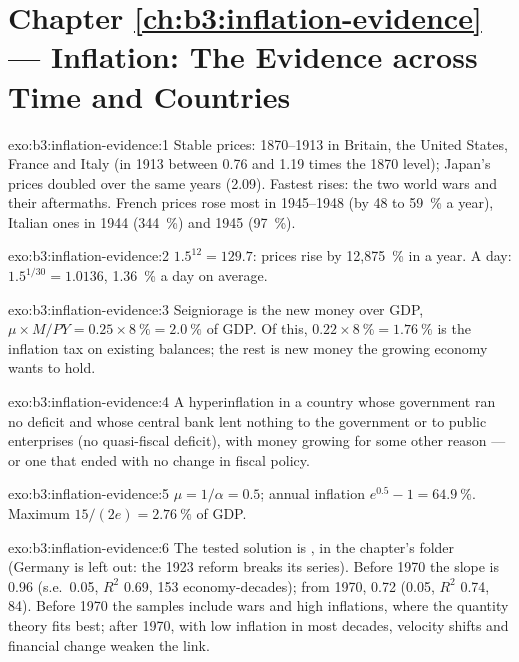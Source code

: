 \section*{Chapter \ref{ch:b3:inflation-evidence} --- Inflation: The Evidence across Time and Countries}

\begin{solution}{exo:b3:inflation-evidence:1}
Stable prices: 1870--1913 in Britain, the United States, France and Italy (in 1913
between 0.76 and 1.19 times the 1870 level); Japan's prices doubled over the same
years (2.09). Fastest rises: the two world wars and their aftermaths.
French prices rose most in 1945--1948 (by 48 to 59~\% a year), Italian ones in
1944 (344~\%) and 1945 (97~\%). %
\end{solution}

\begin{solution}{exo:b3:inflation-evidence:2}
$1.5^{12} = 129.7$: prices rise by 12{,}875~\% in a year. A day: $1.5^{1/30} = 1.0136$, 1.36~\% a
day on average.
\end{solution}

\begin{solution}{exo:b3:inflation-evidence:3}
Seigniorage is the new money over GDP, $\mu \times M/PY = 0.25 \times 8~\% = 2.0~\%$ of GDP. Of this,
$0.22 \times 8~\% = 1.76~\%$ is the inflation tax on existing balances; the rest is new money
the growing economy wants to hold.
\end{solution}

\begin{solution}{exo:b3:inflation-evidence:4}
A hyperinflation in a country whose government ran no deficit and whose central
bank lent nothing to the government or to public enterprises (no quasi-fiscal
deficit), with money growing for some other reason --- or one that ended with no
change in fiscal policy.
\end{solution}

\begin{solution}{exo:b3:inflation-evidence:5}
$\mu = 1/\alpha = 0.5$; annual inflation $e^{0.5} - 1 = 64.9~\%$. Maximum $15/(2e) = 2.76~\%$ of GDP.
\end{solution}

\begin{solution}{exo:b3:inflation-evidence:6}
The tested solution is , in the chapter's 
folder (Germany is left out: the 1923 reform breaks its series). Before 1970 the
slope is 0.96 (s.e.\ 0.05, $R^2$ 0.69, 153 economy-decades); from 1970, 0.72 (0.05,
$R^2$ 0.74, 84). %
Before 1970 the samples include wars and high inflations, where the quantity theory
fits best; after 1970, with low inflation in most decades, velocity shifts and
financial change weaken the link.
\end{solution}

